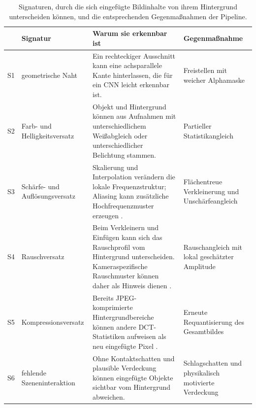 \begin{table}[htbp]
\centering
\caption[Signaturen eingeklebter Objekte]{Signaturen, durch die sich eingefügte Bildinhalte von ihrem Hintergrund unterscheiden können, und die entsprechenden Gegenmaßnahmen der Pipeline.}
\label{tab:signaturen}

\footnotesize
\begin{tabularx}{\textwidth}{
@{}
L{0.035\textwidth}
L{0.24\textwidth}
X
L{0.235\textwidth}
@{}
}
\toprule
&
\textbf{Signatur}
&
\textbf{Warum sie erkennbar ist}
&
\textbf{Gegenmaßnahme}
\\
\midrule

S1 &
geometrische Naht &
Ein rechteckiger Ausschnitt kann eine achsparallele Kante hinterlassen, die für ein CNN leicht erkennbar ist. &
Freistellen mit weicher Alphamaske
\\

S2 &
Farb- und Helligkeitsversatz &
Objekt und Hintergrund können aus Aufnahmen mit unterschiedlichem Weißabgleich oder unterschiedlicher Belichtung stammen. &
Partieller Statistikangleich \parencite{reinhard2001,tsai2017}
\\

S3 &
Schärfe- und Auflösungsversatz &
Skalierung und Interpolation verändern die lokale Frequenzstruktur; Aliasing kann zusätzliche Hochfrequenzmuster erzeugen \parencite{popescu2005,zhangr2019}. &
Flächentreue Verkleinerung und Unschärfeangleich
\\

S4 &
Rauschversatz &
Beim Verkleinern und Einfügen kann sich das Rauschprofil vom Hintergrund unterscheiden. Kameraspezifische Rauschmuster können daher als Hinweis dienen \parencite{lukas2006}. &
Rauschangleich mit lokal geschätzter Amplitude \parencite{immerkaer1996}
\\

S5 &
Kompressionsversatz &
Bereits JPEG-komprimierte Hintergrundbereiche können andere DCT-Statistiken aufweisen als neu eingefügte Pixel \parencite{wallace1992jpeg}. &
Erneute Requantisierung des Gesamtbildes
\\

S6 &
fehlende Szeneninteraktion &
Ohne Kontaktschatten und plausible Verdeckung können eingefügte Objekte sichtbar vom Hintergrund abweichen. &
Schlagschatten und physikalisch motivierte Verdeckung
\\

\bottomrule
\end{tabularx}
\end{table}

